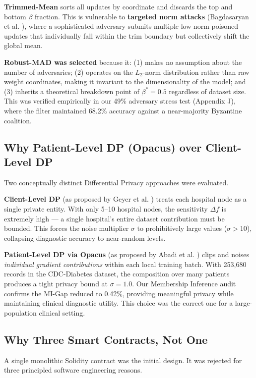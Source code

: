 \documentclass[10pt, a4paper, twocolumn]{article}
\begin{document}
\textbf{Trimmed-Mean} sorts all updates by coordinate and discards the top and bottom $\beta$ fraction. This is vulnerable to \textbf{targeted norm attacks} (Bagdasaryan et al. \cite{bagdasaryan2020}), where a sophisticated adversary submits multiple low-norm poisoned updates that individually fall within the trim boundary but collectively shift the global mean.

\textbf{Robust-MAD was selected} because it: (1) makes no assumption about the number of adversaries; (2) operates on the $L_2$-norm distribution rather than raw weight coordinates, making it invariant to the dimensionality of the model; and (3) inherits a theoretical breakdown point of $\beta^* = 0.5$ regardless of dataset size. This was verified empirically in our 49\% adversary stress test (Appendix J), where the filter maintained 68.2\% accuracy against a near-majority Byzantine coalition.

\subsection{Why Patient-Level DP (Opacus) over Client-Level DP}
Two conceptually distinct Differential Privacy approaches were evaluated.

\textbf{Client-Level DP} (as proposed by Geyer et al. \cite{geyer2017}) treats each hospital node as a single private entity. With only 5--10 hospital nodes, the sensitivity $\Delta f$ is extremely high --- a single hospital's entire dataset contribution must be bounded. This forces the noise multiplier $\sigma$ to prohibitively large values ($\sigma > 10$), collapsing diagnostic accuracy to near-random levels.

\textbf{Patient-Level DP via Opacus} (as proposed by Abadi et al. \cite{abadi2016}) clips and noises \textit{individual gradient contributions} within each local training batch. With 253,680 records in the CDC-Diabetes dataset, the composition over many patients produces a tight privacy bound at $\sigma = 1.0$. Our Membership Inference audit confirms the MI-Gap reduced to 0.42\%, providing meaningful privacy while maintaining clinical diagnostic utility. This choice was the correct one for a large-population clinical setting.

\subsection{Why Three Smart Contracts, Not One}
A single monolithic Solidity contract was the initial design. It was rejected for three principled software engineering reasons.
\end{document}
